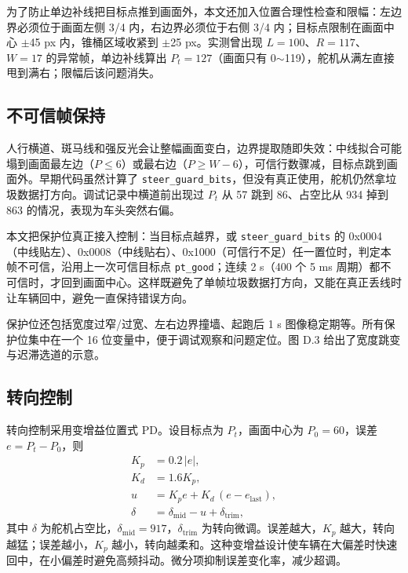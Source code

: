 \documentclass{MaiTechReport}
\begin{document}
为了防止单边补线把目标点推到画面外，本文还加入位置合理性检查和限幅：左边界必须位于画面左侧 3/4 内，右边界必须位于右侧 3/4 内；目标点限制在画面中心 $\pm$45 px 内，锥桶区域收紧到 $\pm$25 px。实测曾出现 $L=100$、$R=117$、$W=17$ 的异常帧，单边补线算出 $P_t=127$（画面只有 0$\sim$119），舵机从满左直接甩到满右；限幅后该问题消失。

\subsection{不可信帧保持}
人行横道、斑马线和强反光会让整幅画面变白，边界提取随即失效：中线拟合可能塌到画面最左边（$P\le 6$）或最右边（$P\ge W-6$），可信行数骤减，目标点跳到画面外。早期代码虽然计算了 \texttt{steer\_guard\_bits}，但没有真正使用，舵机仍然拿垃圾数据打方向。调试记录中横道前出现过 $P_t$ 从 57 跳到 86、占空比从 934 掉到 863 的情况，表现为车头突然右偏。

本文把保护位真正接入控制：当目标点越界，或 \texttt{steer\_guard\_bits} 的 0x0004（中线贴左）、0x0008（中线贴右）、0x1000（可信行不足）任一置位时，判定本帧不可信，沿用上一次可信目标点 \texttt{pt\_good}；连续 2 s（400 个 5 ms 周期）都不可信时，才回到画面中心。这样既避免了单帧垃圾数据打方向，又能在真正丢线时让车辆回中，避免一直保持错误方向。

保护位还包括宽度过窄/过宽、左右边界撞墙、起跑后 1 s 图像稳定期等。所有保护位集中在一个 16 位变量中，便于调试观察和问题定位。图 D.3 给出了宽度跳变与迟滞选道的示意。



\subsection{转向控制}
转向控制采用变增益位置式 PD。设目标点为 $P_t$，画面中心为 $P_0=60$，误差 $e=P_t-P_0$，则
\begin{equation}
  \begin{aligned}
    K_p &= 0.2\,|e|,\\
    K_d &= 1.6K_p,\\
    u &= K_p e + K_d\,(e-e_{\mathrm{last}}),\\
    \delta &= \delta_{\mathrm{mid}}-u+\delta_{\mathrm{trim}},
  \end{aligned}
  \label{eq:pd}
\end{equation}
其中 $\delta$ 为舵机占空比，$\delta_{\mathrm{mid}}=917$，$\delta_{\mathrm{trim}}$ 为转向微调。误差越大，$K_p$ 越大，转向越猛；误差越小，$K_p$ 越小，转向越柔和。这种变增益设计使车辆在大偏差时快速回中，在小偏差时避免高频抖动。微分项抑制误差变化率，减少超调。
\end{document}
